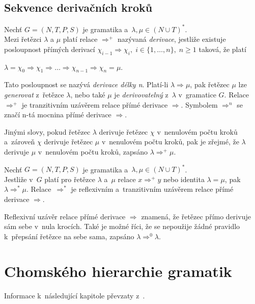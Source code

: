 \subsection*{Sekvence derivačních kroků}\label{kap_sekvence_der_kroku}
\begin{definition}\label{def_der_krok_tranz}
    Nechť $G = (N, T, P, S)$ je gramatika a~$\lambda, \mu \in (N \cup T)^*$. \\
    Mezi řetězci $\lambda$ a $\mu$ platí relace $\Rightarrow^+$ nazývaná \emph{derivace}, jestliže existuje posloupnost přímých derivací $\chi_{i-1} \Rightarrow \chi_i,\; i \in \{1, \ldots, n\},\; n \geq 1$ taková, že platí
    \begin{center}
        $\lambda = \chi_0 \Rightarrow \chi_1 \Rightarrow \ldots \Rightarrow \chi_{n-1} \Rightarrow \chi_n = \mu$.
    \end{center}
    Tato posloupnost se nazývá \emph{derivace délky n}.
    Platí-li $\lambda \Rightarrow \mu$, pak řetězec $\mu$ lze \emph{generovat} z~řetězce $\lambda$, nebo také $\mu$ je \emph{derivovatelný} z~$\lambda$ v~gramatice $G$.
    Relace $\Rightarrow^+$ je tranzitivním uzávěrem relace přímé derivace $\Rightarrow$.
    Symbolem $\Rightarrow^n$ se značí n-tá mocnina přímé derivace $\Rightarrow$.
\end{definition}
Jinými slovy, pokud řetězec $\lambda$ derivuje řetězec $\chi$ v~nenulovém počtu kroků a~zároveň $\chi$ derivuje řetězec $\mu$ v~nenulovém počtu kroků, pak je zřejmé, že $\lambda$ derivuje $\mu$ v~nenulovém počtu kroků, zapsáno $\lambda \Rightarrow^+ \mu$. 

\begin{definition}\label{def_der_krok_refl_tranz}
    Nechť $G = (N, T, P, S)$ je gramatika a~$\lambda, \mu \in (N \cup T)^*$. \\
    Jestliže v~$G$ platí pro řetězce $\lambda$ a~$\mu$ relace $x \Rightarrow^+ y$ nebo identita $\lambda = \mu$, pak $\lambda \Rightarrow^* \mu$.
    Relace~$\Rightarrow^*$ je reflexivním a~tranzitivním uzávěrem relace přímé derivace $\Rightarrow$.  
\end{definition}
Reflexivní uzávěr relace přímé derivace $\Rightarrow$ znamená, že řetězec přímo derivuje sám sebe v~nula krocích.
Také je možné říci, že se nepoužije žádné pravidlo k~přepsání řetězce na sebe sama, zapsáno $\lambda \Rightarrow^0 \lambda$.

\section{Chomského hierarchie gramatik}\label{kap_chomsky_hierarchie}
Informace k~následující kapitole převzaty z~\cite{TIN-opora}.

